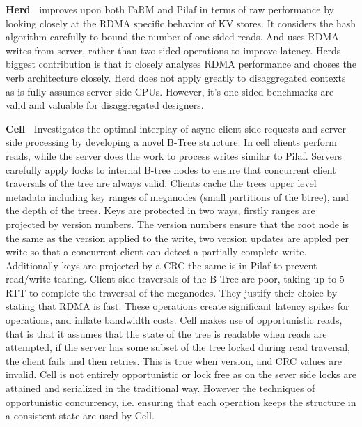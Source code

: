 \textbf{Herd~\cite{herd}} improves upon both FaRM and Pilaf in terms of raw
performance by looking closely at the RDMA specific behavior of KV stores. It
considers the hash algorithm carefully to bound the number of one sided reads.
And uses RDMA writes from server, rather than two sided operations to improve
latency. Herds biggest contribution is that it closely analyses RDMA performance
and choses the verb architecture closely. Herd does not apply greatly to
disaggregated contexts as is fully assumes server side CPUs. However, it's one
sided benchmarks are valid and valuable for disaggregated designers.


\textbf{Cell~\cite{cell}} Investigates the optimal interplay of async client
side requests and server side processing by developing a novel B-Tree structure.
In cell clients perform reads, while the server does the work to process writes
similar to Pilaf.
%
Servers carefully apply locks to internal B-tree nodes to ensure that concurrent
client traversals of the tree are always valid. Clients cache the trees upper
level metadata including key ranges of meganodes (small partitions of the
btree), and the depth of the trees.
%
Keys are protected in two ways, firstly ranges are projected by version numbers.
The version numbers ensure that the root node is the same as the version applied
to the write, two version updates are appled per write so that a concurrent
client can detect a partially complete write. Additionally keys are projected by
a CRC the same is in Pilaf to prevent read/write tearing.
%
Client side traversals of the B-Tree are poor, taking up to 5 RTT to complete
the traversal of the meganodes. They justify their choice by stating that RDMA
is fast. These operations create significant latency spikes for operations, and
inflate bandwidth costs.
%
Cell makes use of opportunistic reads, that is that it assumes that the state of
the tree is readable when reads are attempted, if the server has some subset of
the tree locked during read traversal, the client fails and then retries. This
is true when version, and CRC values are invalid. Cell is not entirely
opportunistic or lock free as on the sever side locks are attained and
serialized in the traditional way. However the techniques of opportunistic
concurrency, i.e. ensuring that each operation keeps the structure in a
consistent state are used by Cell.



